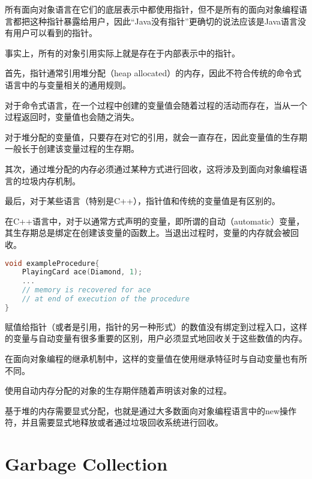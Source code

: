 所有面向对象语言在它们的底层表示中都使用指针，但不是所有的面向对象编程语言都把这种指针暴露给用户，因此“Java没有指针”更确切的说法应该是Java语言没有用户可以看到的指针。

事实上，所有的对象引用实际上就是存在于内部表示中的指针。

首先，指针通常引用堆分配（heap allocated）的内存，因此不符合传统的命令式语言中的与变量相关的通用规则。

\begin{compactitem}
\item 对于命令式语言，在一个过程中创建的变量值会随着过程的活动而存在，当从一个过程返回时，变量值也会随之消失。
\item 对于堆分配的变量值，只要存在对它的引用，就会一直存在，因此变量值的生存期一般长于创建该变量过程的生存期。
\end{compactitem}

其次，通过堆分配的内存必须通过某种方式进行回收，这将涉及到面向对象编程语言的垃圾内存机制。

最后，对于某些语言（特别是C++），指针值和传统的变量值是有区别的。

在C++语言中，对于以通常方式声明的变量，即所谓的自动（automatic）变量，其生存期总是绑定在创建该变量的函数上。当退出过程时，变量的内存就会被回收。

\begin{lstlisting}[language=C++]
void exampleProcedure{
	PlayingCard ace(Diamond, 1);
	...
	// memory is recovered for ace
	// at end of execution of the procedure
}
\end{lstlisting}


赋值给指针（或者是引用，指针的另一种形式）的数值没有绑定到过程入口，这样的变量与自动变量有很多重要的区别，用户必须显式地回收关于这些数值的内存。

在面向对象编程的继承机制中，这样的变量值在使用继承特征时与自动变量也有所不同。

\begin{compactitem}
\item 使用自动内存分配的对象的生存期伴随着声明该对象的过程。
\item 基于堆的内存需要显式分配，也就是通过大多数面向对象编程语言中的new操作符，并且需要显式地释放或者通过垃圾回收系统进行回收。
\end{compactitem}

\section{Garbage Collection}

